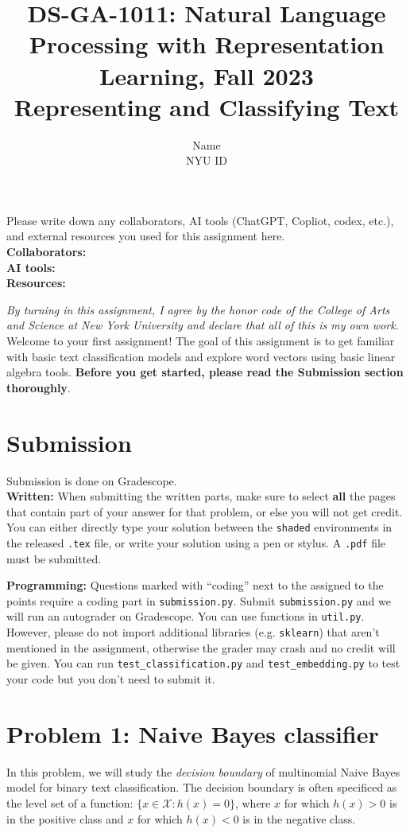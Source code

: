 \documentclass{article}
\title{\textbf{DS-GA-1011: Natural Language Processing with Representation Learning, Fall 2023} \\Representing and Classifying Text}
\author{Name \\
NYU ID}
\date{}
\theoremstyle{case}
\theoremstyle{definition}
\begin{document}
\maketitle
\begin{tcolorbox}
Please write down any collaborators, AI tools (ChatGPT, Copliot, codex, etc.), and external resources you used for this assignment here. \\
\textbf{Collaborators:} \\
\textbf{AI tools:} \\
\textbf{Resources:} 
\end{tcolorbox}
\textit{By turning in this assignment, I agree by the honor code of the College of Arts and Science at New York University and declare
that all of this is my own work.} \\


Welcome to your first assignment! The goal of this assignment is to get familiar with basic text classification models and explore word vectors using basic linear algebra tools.
\textbf{Before you get started, please read the Submission section thoroughly}.

\section*{Submission}
Submission is done on Gradescope. \\

\textbf{Written:} When submitting the written parts, make sure to select \textbf{all} the pages that contain part of your answer for that problem, or else you will not get credit.
You can either directly type your solution between the \texttt{shaded} environments in the released \texttt{.tex} file,
or write your solution using a pen or stylus. 
A \texttt{.pdf} file must be submitted.

\textbf{Programming:} Questions marked with ``coding'' next to the assigned to the points require a coding part in \texttt{submission.py}.
Submit \texttt{submission.py} and we will run an autograder on Gradescope. You can use functions in \texttt{util.py}. However, please do not import additional libraries (e.g. \texttt{sklearn}) that aren't mentioned in the assignment, otherwise the grader may crash and no credit will be given.
You can run \texttt{test\_classification.py} and \texttt{test\_embedding.py} to test your code but you don't need to submit it.

\section*{Problem 1: Naive Bayes classifier}
In this problem, we will study the \emph{decision boundary} of multinomial Naive Bayes model for binary text classification.
The decision boundary is often specificed as the level set of a function:
$\{x\in\mathcal{X} : h(x) = 0\}$,
where $x$ for which $h(x) > 0$ is in the positive class and
$x$ for which $h(x) < 0$ is in the negative class.
\end{document}
